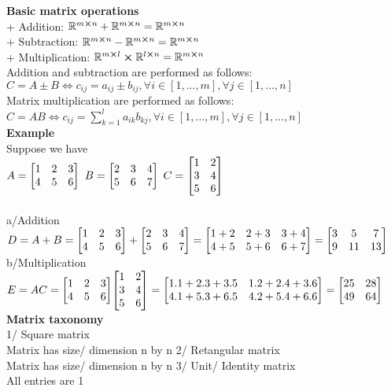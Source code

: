 \documentclass[12pt,a4paper]{article}
\begin{document}
\noindent\textbf{Basic matrix operations}\\
+ Addition: $\mathbb{R}^{m\cross n}+\mathbb{R}^{m\cross n}=\mathbb{R}^{m\cross n}$\\
+ Subtraction: $\mathbb{R}^{m\cross n}-\mathbb{R}^{m\cross n}=\mathbb{R}^{m\cross n}$\\
+ Multiplication: $\mathbb{R}^{m\cross l}\cross\mathbb{R}^{l\cross n}=\mathbb{R}^{m\cross n}$\\

\noindent Addition and subtraction are performed as follows:\\
$C=A\pm B \iff c_{ij}=a_{ij}\pm b_{ij}, \forall i\in[1,...,m], \forall j\in[1,...,n]$\\

\noindent Matrix multiplication are performed as follows:\\
$C=AB \iff c_{ij}=\sum_{k=1}^{l} a_{ik}b_{kj}, \forall i\in[1,...,m], \forall j\in[1,...,n]$\\

\noindent \textbf{Example}\\
Suppose we have\\
$A=\mqty[1 & 2& 3\\
         4 & 5& 6]$
$B=\mqty[2 & 3& 4\\
		 5 & 6& 7]$
$C=\mqty[1 & 2\\
		 3 & 4\\
		 5 & 6\\
		 ]$\\\\
\noindent a/Addition\\
$D=A+B=
\mqty[1 & 2& 3\\ 4 & 5& 6]+
\mqty[2 & 3& 4\\ 5 & 6& 7]
=\mqty[1+2 & 2+3& 3+4\\ 4+5 & 5+6& 6+7]
=\mqty[3 & 5& 7\\ 9 & 11& 13]$\\
      
\noindent b/Multiplication\\
$E=AC=
\mqty[1& 2& 3\\
      4& 5& 6]
\mqty[1& 2\\
      3& 4\\
      5& 6]
=\mqty[1.1+2.3+3.5 & 1.2+2.4+3.6\\
       4.1+5.3+6.5 &4.2+5.4+6.6]
=\mqty[\admat{25& 28\\ 49& 64}]$\\
\textbf{Matrix taxonomy}\\
1/ Square matrix\\
Matrix has size/ dimension n by n
2/ Retangular matrix\\
Matrix has size/ dimension n by n
3/ Unit/ Identity matrix\\
All entries are 1\\
\end{document}
